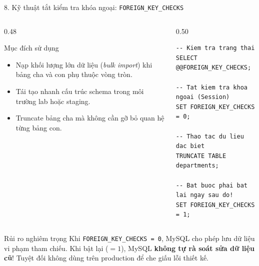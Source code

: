 \documentclass[aspectratio=169,11pt]{beamer}
\begin{document}
\begin{frame}[fragile]{8. Kỹ thuật tắt kiểm tra khóa ngoại: \texttt{FOREIGN\_KEY\_CHECKS}}
\begin{columns}[t]
  \begin{column}{0.48\textwidth}
    \begin{block}{Mục đích sử dụng}
      \begin{itemize}\setlength{\itemsep}{1.5pt}
        \item Nạp khối lượng lớn dữ liệu (\textit{bulk import}) khi bảng cha và con phụ thuộc vòng tròn.
        \item Tái tạo nhanh cấu trúc schema trong môi trường lab hoặc staging.
        \item Truncate bảng cha mà không cần gỡ bỏ quan hệ từng bảng con.
      \end{itemize}
    \end{block}
  \end{column}
  \begin{column}{0.50\textwidth}
\begin{lstlisting}
-- Kiem tra trang thai
SELECT @@FOREIGN_KEY_CHECKS;

-- Tat kiem tra khoa ngoai (Session)
SET FOREIGN_KEY_CHECKS = 0;

-- Thao tac du lieu dac biet
TRUNCATE TABLE departments;

-- Bat buoc phai bat lai ngay sau do!
SET FOREIGN_KEY_CHECKS = 1;
\end{lstlisting}
  \end{column}
\end{columns}

\begin{alertblock}{Rủi ro nghiêm trọng}
  Khi \texttt{FOREIGN\_KEY\_CHECKS = 0}, MySQL cho phép lưu dữ liệu vi phạm tham chiếu. Khi bật lại ($= 1$), MySQL \textbf{không tự rà soát sửa dữ liệu cũ}! Tuyệt đối không dùng trên production để che giấu lỗi thiết kế.
\end{alertblock}
\end{frame}

\end{document}
